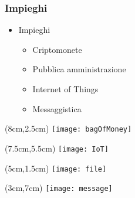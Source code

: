 \begin{frame}
  \frametitle{Impieghi}

  \begin{itemize}
   \item<1-> Impieghi
   \begin{itemize}
    \item Criptomonete
    \item Pubblica amministrazione
    \item Internet of Things
    \item Messaggistica
   \end{itemize}
  \end{itemize}

 \begin{textblock*}{5cm}(8cm,2.5cm)
  \texttt{[image: bagOfMoney]}
 \end{textblock*}

 \begin{textblock*}{5cm}(7.5cm,5.5cm)
  \texttt{[image: IoT]}
 \end{textblock*}

 \begin{textblock*}{5cm}(5cm,1.5cm)
  \texttt{[image: file]}
 \end{textblock*}

 \begin{textblock*}{5cm}(3cm,7cm)
  \texttt{[image: message]}
 \end{textblock*}

\end{frame}
